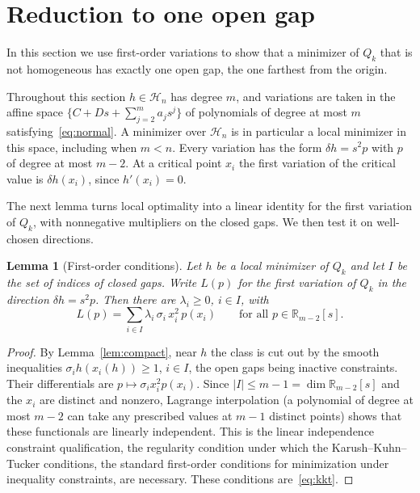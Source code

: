 \documentclass[11pt]{article}
\newtheorem{lemma}[theorem]{Lemma}
\theoremstyle{remark}
\newcommand{\HH}{\mathcal H}
\begin{document}
\section{Reduction to one open gap}\label{sec:gaps}

In this section we use first-order variations to show that a minimizer of
$Q_k$ that is not homogeneous has exactly one open gap, the one farthest
from the origin.

Throughout this section $h\in\HH_n$ has degree $m$, and variations are taken
in the affine space $\{C+Ds+\sum_{j=2}^ma_js^j\}$ of polynomials of degree at
most $m$ satisfying~\eqref{eq:normal}. A minimizer over $\HH_n$ is in
particular a local minimizer in this space, including when $m<n$. Every
variation has the form $\delta h=s^2p$ with $p$ of degree at most $m-2$.
At a critical point $x_i$ the first variation of the critical value is
$\delta h(x_i)$, since $h'(x_i)=0$.

The next lemma turns local optimality into a linear identity for the first
variation of $Q_k$, with nonnegative multipliers on the closed gaps. We
then test it on well-chosen directions.

\begin{lemma}[First-order conditions]\label{lem:kkt}
Let $h$ be a local minimizer of $Q_k$ and let $I$ be the set of indices of
closed gaps. Write $L(p)$ for the first variation of $Q_k$ in the direction
$\delta h=s^2p$. Then there are $\lambda_i\ge0$, $i\in I$, with
\begin{equation}\label{eq:kkt}
L(p)=\sum_{i\in I}\lambda_i\,\sigma_i\,x_i^2\,p(x_i)\qquad
\text{for all }p\in\mathbb R_{m-2}[s].
\end{equation}
\end{lemma}

\begin{proof}
By Lemma~\ref{lem:compact}, near $h$ the class is cut out by the smooth
inequalities $\sigma_ih(x_i(h))\ge1$, $i\in I$, the open gaps being
inactive constraints. Their differentials are $p\mapsto\sigma_ix_i^2p(x_i)$. Since
$|I|\le m-1=\dim\mathbb R_{m-2}[s]$ and the $x_i$ are distinct and nonzero,
Lagrange interpolation (a polynomial of degree at most $m-2$ can take any
prescribed values at $m-1$ distinct points) shows that these functionals
are linearly independent. This is the linear independence constraint
qualification, the regularity condition under which the
Karush--Kuhn--Tucker conditions, the standard first-order conditions for
minimization under inequality constraints, are necessary. These conditions
are~\eqref{eq:kkt}.
\end{proof}
\end{document}
